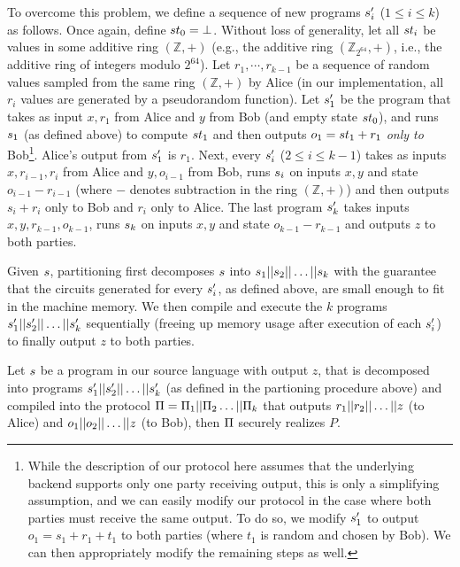 To overcome this problem, we define a sequence of new programs
$s'_i$ ($1\leq i\leq k$) as follows. Once again, define $st_0
= \bot$. Without
loss of generality, let all $st_i$ be values in some additive ring
$(\mathbb{Z},+)$ (e.g., the additive ring $(\mathbb{Z}_{2^{64}},+)$,
i.e., the additive ring of integers modulo $2^{64}$).
Let $r_1,\cdots,r_{k-1}$ be a sequence of random values sampled from
the same ring $(\mathbb{Z},+)$ by Alice (in our implementation, all
$r_i$ values are generated by a pseudorandom function). Let $s'_1$
be the program that takes as input $x,r_1$ from Alice and $y$ from Bob
(and empty state $st_0$), and runs $s_1$ (as defined above) to
compute $st_1$ and then outputs $o_1 = st_1 + r_1$ {\em only
  to} Bob\footnote{While the description of our protocol here assumes
  that
  the underlying backend supports only one party receiving output,
  this is only a simplifying assumption, and we can easily modify our
  protocol in the case where both parties must receive the same
  output. To do so, we modify $s'_1$ to output $o_1 = s_1+r_1+t_1$ to
  both parties (where $t_1$ is random and chosen by Bob). We can then
  appropriately modify the remaining steps as well.}. Alice's output
from $s'_1$ is $r_1$. Next, every $s'_i$ ($2\leq i\leq k-1$)
takes as inputs $x,r_{i-1},r_i$ from Alice and $y,o_{i-1}$ from Bob,
runs $s_i$
on inputs $x,y$ and state $o_{i-1}-r_{i-1}$ (where $-$ denotes
subtraction in the ring $(\mathbb{Z},+)$) and then outputs $s_i+r_i$
only to Bob and $r_i$ only to Alice. The last
program $s'_k$ takes inputs $x,y,r_{k-1},o_{k-1}$, runs $s_k$
on inputs $x,y$ and state $o_{k-1}-r_{k-1}$ and outputs $z$ to both
parties.

Given $s$, partitioning first decomposes $s$ into
$s_1||s_2||\dots||s_k$ with the guarantee that the
circuits generated for every $s'_i$, as defined above, are small
enough to fit in the machine memory. We then compile and execute the
$k$ programs $s'_1||s'_2||\dots||s'_k$ sequentially
(freeing up memory usage after execution of each $s'_i$) to
finally output $z$ to both parties.

\begin{theorem}
Let $s$ be a program in our source language with output $z$, that
is decomposed into programs
$s'_1||s'_2||\dots||s'_k$ (as defined in
the partioning procedure above) and compiled into the protocol $\Pi
= \Pi_1||\Pi_2\dots||\Pi_k$ that outputs $r_1||
r_2||\dots|| z$
(to Alice) and $o_1|| o_2||\dots||z$ (to Bob), then $\Pi$ securely
realizes $P$.
\end{theorem}

